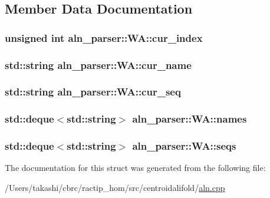 \subsection{Member Data Documentation}
\hypertarget{structaln__parser_1_1_w_a_ae1cf2b0998aee4041e4f8cb695b11547}{
\subsubsection[{cur\+\_\+index}]{\setlength{\rightskip}{0pt plus 5cm}unsigned int aln\+\_\+parser\+::\+W\+A\+::cur\+\_\+index}}\label{structaln__parser_1_1_w_a_ae1cf2b0998aee4041e4f8cb695b11547}
\hypertarget{structaln__parser_1_1_w_a_a815e71b42f92a2e42d834c864dd49922}{
\subsubsection[{cur\+\_\+name}]{\setlength{\rightskip}{0pt plus 5cm}std\+::string aln\+\_\+parser\+::\+W\+A\+::cur\+\_\+name}}\label{structaln__parser_1_1_w_a_a815e71b42f92a2e42d834c864dd49922}
\hypertarget{structaln__parser_1_1_w_a_adb0f22840fc3398a742fc43cbcfb3d1a}{
\subsubsection[{cur\+\_\+seq}]{\setlength{\rightskip}{0pt plus 5cm}std\+::string aln\+\_\+parser\+::\+W\+A\+::cur\+\_\+seq}}\label{structaln__parser_1_1_w_a_adb0f22840fc3398a742fc43cbcfb3d1a}
\hypertarget{structaln__parser_1_1_w_a_a0fbe85211bc67c62db9861c69308e230}{
\subsubsection[{names}]{\setlength{\rightskip}{0pt plus 5cm}std\+::deque$<$std\+::string$>$ aln\+\_\+parser\+::\+W\+A\+::names}}\label{structaln__parser_1_1_w_a_a0fbe85211bc67c62db9861c69308e230}
\hypertarget{structaln__parser_1_1_w_a_a8656635718affd8a4082813449be2c95}{
\subsubsection[{seqs}]{\setlength{\rightskip}{0pt plus 5cm}std\+::deque$<$std\+::string$>$ aln\+\_\+parser\+::\+W\+A\+::seqs}}\label{structaln__parser_1_1_w_a_a8656635718affd8a4082813449be2c95}


The documentation for this struct was generated from the following file\+:\begin{DoxyCompactItemize}
\item 
/\+Users/takashi/cbrc/ractip\+\_\+hom/src/centroidalifold/\hyperlink{aln_8cpp}{aln.\+cpp}\end{DoxyCompactItemize}
